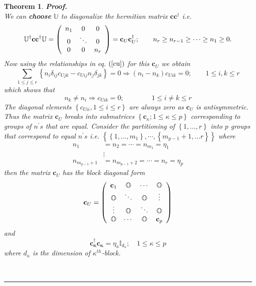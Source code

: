 \documentclass[aps,preprint]{revtex4}%
\newtheorem{theorem}{Theorem}
\newenvironment{proof}[1][Proof]{\noindent\textbf{#1.} }{\ \rule{0.5em}{0.5em}}
\begin{document}
\begin{theorem}
\begin{proof}
\begin{equation}
\end{equation}
We can \textbf{choose} $\mathbb{U}$ to diagonalize the hermitian matrix
$\mathbf{cc}^{\dagger}$ i.e.%
\begin{equation}
\mathbb{U}^{\dagger}\mathbf{cc}\mathbb{^{\dagger}U}=\left(
\begin{array}
[c]{ccc}%
n_{1} & 0 & 0\\
0 & \ddots & 0\\
0 & 0 & n_{r}%
\end{array}
\right)  =\mathbf{c}_{U}\mathbf{c}_{U}^{\dagger};\qquad n_{r}\geq n_{r-1}%
\geq\cdots\geq n_{1}\geq0.
\end{equation}
Now using the relationships in eq. $\left(  \ref{cu}\right)  $ for this
$\mathbf{c}_{U}$ we obtain%
\begin{equation}
\sum_{1\leq j\leq r}\left\{  n_{i}\delta_{ij}c_{Ujk}-c_{Uij}n_{j}\delta
_{jk}\right\}  =0\Rightarrow\left(  n_{i}-n_{k}\right)  c_{Uik}=0;\qquad1\leq
i,k\leq r\label{dub1}%
\end{equation}
which shows that
\begin{equation}
n_{k}\neq n_{i}\Rightarrow c_{Uik}=0;\qquad\qquad1\leq i\neq k\leq r
\end{equation}
The diagonal elements $\left\{  c_{Uii},1\leq i\leq r\right\}  $ are always
zero as $\mathbf{c}_{U}$ is antisymmetric. Thus the matrix $\mathbf{c}_{U}$
breaks into submatrices $\left\{  \mathbf{c}_{\kappa};1\leq\kappa\leq
p\right\}  $ corresponding to groups of $n^{\prime}s$ that are equal. Consider
the partitioning of $\left\{  1,\ldots,r\right\}  $ into $p$ groups that
correspond to equal $n^{\prime}s$ i.e. $\left\{  \left\{  1,\ldots
,m_{1}\right\}  ,\cdots,\left\{  m_{p-1}+1,\ldots r\right\}  \right\}  $
where
\begin{align}
n_{1} &  =n_{2}=\cdots=n_{m_{1}}=\eta_{1}\nonumber\\
&  \vdots\nonumber\\
n_{m_{p-1}+1} &  =n_{m_{p-1}+2}=\cdots=n_{r}=\eta_{p}%
\end{align}
then the matrix $\mathbf{c}_{U}$ has the block diagonal form
\begin{equation}
\mathbf{c}_{U}=\left(
\begin{array}
[c]{cccc}%
\mathbf{c}_{1} & \mathbb{O} & \cdots & \mathbb{O}\\
\mathbb{O} & \ddots & \mathbb{O} & \vdots\\
\vdots & \mathbb{O} & \ddots & \mathbb{O}\\
\mathbb{O} & \cdots & \mathbb{O} & \mathbf{c}_{p}%
\end{array}
\right)
\end{equation}
and
\begin{equation}
\mathbf{c_{\kappa}^{\dagger}c_{\kappa}}=\eta_{\kappa}\mathbb{I}_{d_{\kappa}%
};\quad1\leq\kappa\leq p\label{dub2}%
\end{equation}
where $d_{\kappa}$ is the dimension of $\kappa^{th}$-block.


\end{proof}
\end{theorem}
\end{document}
